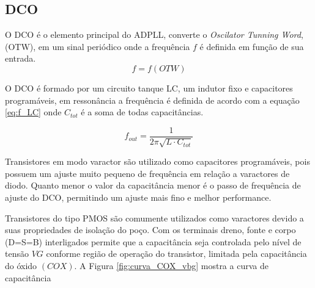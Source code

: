 



\subsection{DCO}
O DCO é o elemento principal do ADPLL, converte o \textit{Oscilator Tunning Word}, (OTW), em um sinal periódico onde a frequência $f$ é definida em função de sua entrada.
\begin{equation}
	f = f(OTW)
	\label{eq:f_OTW}
\end{equation}

O DCO é formado por um circuito tanque LC, um indutor fixo e capacitores programáveis, em ressonância a frequência é definida de acordo com a equação \ref{eq:f_LC} onde $C_{tot}$ é a soma de todas capacitâncias.

\begin{equation}
	f_{out} = \frac{1}{2 \pi \sqrt{L \cdot C_{tot}}}
	\label{eq:f_LC}
\end{equation}

Transistores em modo varactor são utilizado como capacitores programáveis, pois possuem um ajuste muito pequeno de frequência em relação a varactores de diodo. Quanto menor o valor da capacitância menor é o  passo de frequência de ajuste do DCO, permitindo um ajuste mais fino e melhor performance. 

Transistores do tipo PMOS são comumente utilizados como varactores devido a suas propriedades de isolação do poço. Com os terminais dreno, fonte e corpo (D=S=B) interligados permite que a capacitância seja controlada pelo nível de tensão $VG$ conforme região de operação do transistor, limitada pela capacitância do óxido $(COX)$. A Figura \ref{fig:curva_COX_vbg} mostra a curva de capacitância

